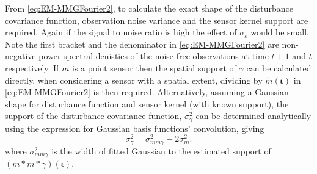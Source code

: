 \documentclass[]{article}
\begin{document}
From \eqref{eq:EM-MMGFourier2}, to calculate the exact shape of the disturbance covariance function, observation noise variance and the sensor kernel support are required. Again if the signal to noise ratio is high the effect of $\sigma_{\varepsilon}$ would be small. Note the first bracket and the denominator in \eqref{eq:EM-MMGFourier2} are non-negative power spectral denisties of the noise free observations at time $t+1$ and $t$ respectively. If $m$ is a point sensor then the spatial support of $\gamma$ can be calculated directly, when considering a sensor with a spatial extent, dividing by $\tilde{m}(\boldsymbol\iota)$ in \eqref{eq:EM-MMGFourier2} is then required. Alternatively, assuming a Gaussian shape for disturbance function and sensor kernel (with known support), the support of the disturbance covariance function, $\sigma^2_{\gamma}$ can be determined analytically using the expression for Gaussian basis functions' convolution, giving 
\begin{equation}\label{eq:AnalyticSupportCalculation}
 \sigma_{\gamma}^2=\sigma_{mm\gamma}^2-2\sigma_m^2.
\end{equation}
where $\sigma_{mm\gamma}^2$ is the width of fitted Gaussian to the estimated support of $(m\ast m\ast\gamma)(\boldsymbol\iota)$.
\end{document}
